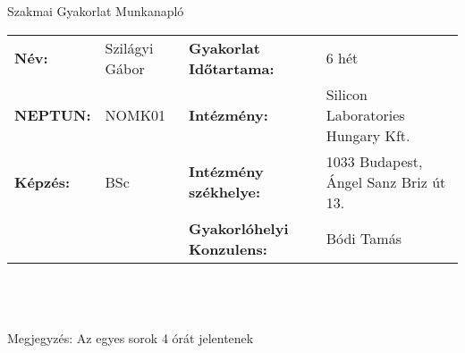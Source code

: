\documentclass[10pt,a4paper,oneside]{report}
\begin{document}
\begin{center}
	\Large{Szakmai Gyakorlat Munkanapló}
\end{center}
\vspace{0.5 cm}
\begin{tabular}{p{2.5 cm} p{2.5 cm} p{5 cm} p{6 cm}}
	\textbf{Név:} & Szilágyi Gábor & \textbf{Gyakorlat Időtartama:} & 6 hét\\
	\textbf{NEPTUN:} & NOMK01 & \textbf{Intézmény:} & Silicon Laboratories Hungary Kft.\\
	\textbf{Képzés:} & BSc & \textbf{Intézmény székhelye:} & 1033 Budapest, Ángel Sanz Briz út 13. \\
	& & \textbf{Gyakorlóhelyi Konzulens:} & Bódi Tamás
\end{tabular} \\ \\\\
Megjegyzés: Az egyes sorok 4 órát jelentenek \\
\end{document}
